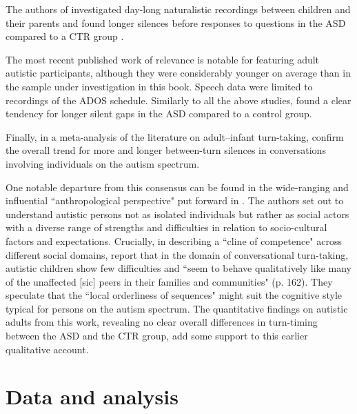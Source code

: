 The authors of \citet{warlaumontVocalInteractionDynamics2010} investigated day-long naturalistic recordings between children and their parents and found longer silences before responses to questions in the ASD compared to a CTR group \citep[see also][]{warlaumontSocialFeedbackLoop2014}.

The most recent published work of relevance \citep{ochiQuantificationSpeechSynchrony2019} is notable for featuring adult autistic participants, although they were considerably younger on average than in the sample under investigation in this book. Speech data were limited to recordings of the ADOS schedule. Similarly to all the above studies, \citet{ochiQuantificationSpeechSynchrony2019} found a clear tendency for longer silent gaps in the ASD compared to a control group.

Finally, in a meta-analysis of the literature on adult–infant turn-taking, \citet{nguyenSystematicReviewBayesian2022} confirm the overall trend for more and longer between-turn silences in conversations involving individuals on the autism spectrum.

One notable departure from this consensus can be found in the wide-ranging and influential ``anthropological perspective" put forward in \citet{ochsAutismSocialWorld2004}. The authors set out to understand autistic persons not as isolated individuals but rather as social actors with a diverse range of strengths and difficulties in relation to socio-cultural factors and expectations. Crucially, in describing a ``cline of competence" across different social domains, \citet{ochsAutismSocialWorld2004} report that in the domain of conversational turn-taking, autistic children show few difficulties and ``seem to behave qualitatively like many of the unaffected [sic] peers in their families and communities" (p. 162). They speculate that the ``local orderliness of sequences" might suit the cognitive style typical for persons on the autism spectrum. The quantitative findings on autistic adults from this work, revealing no clear overall differences in turn-timing between the ASD and the CTR group, add some support to this earlier qualitative account.










\section{Data and analysis}\label{sec:turntaking_analysis}


